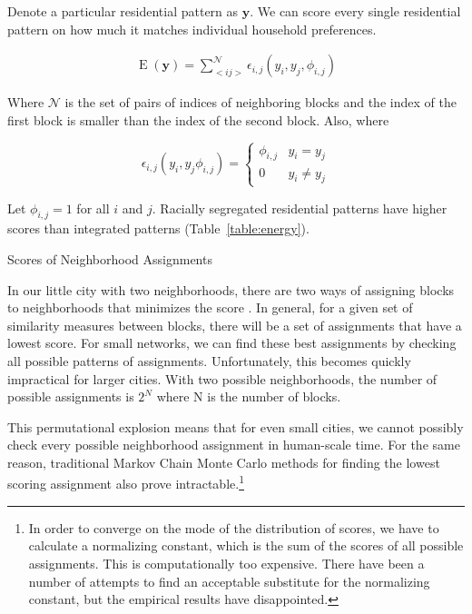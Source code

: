 Denote a particular residential pattern as $\mathbf{y}$.  We can score
every single residential pattern on how much it matches individual
household preferences.

\begin{align}
\operatorname{E}(\mathbf{y}) = \sum_{<i j>}^{\mathcal{N}}\epsilon_{i,j}(y_i,y_j,\phi_{i,j})
\end{align}

Where $\mathcal{N}$ is the set of pairs of indices of neighboring
blocks and the index of the first block is smaller than the index of
the second block. Also, where


\begin{equation}
\epsilon_{i,j}(y_i,y_j\phi_{i,j}) = \begin{cases}
  \phi_{i,j}   &y_i = y_j \\
  0  &y_i \neq y_j
\end{cases}
\end{equation}

Let $\phi_{i,j}=1$ for all $i$ and $j$. Racially segregated
residential patterns have higher scores than integrated patterns (Table~\ref{table:energy}).

\begin{table}[h]

\caption{Scores of Neighborhood Assignments}
\label{table:energy}
\end{table}

In our little city with two neighborhoods, there are two ways of
assigning blocks to neighborhoods that minimizes the score . In general, for a given set of similarity
measures between blocks, there will be a set of assignments that have
a lowest score. For small networks, we can find these best assignments
by checking all possible patterns of assignments. Unfortunately, this
becomes quickly impractical for larger cities. With two possible
neighborhoods, the number of possible assignments is $2^N$ where N is
the number of blocks.

This permutational explosion means that for even small cities, we
cannot possibly check every possible neighborhood assignment in
human-scale time. For the same reason, traditional Markov Chain Monte
Carlo methods for finding the lowest scoring assignment also prove
intractable.\footnote{In order to converge on the mode of the
  distribution of scores, we have to calculate a normalizing constant,
  which is the sum of the scores of all possible assignments. This is
  computationally too expensive. There have been a number of attempts
  to find an acceptable substitute for the normalizing constant, but
  the empirical results have disappointed.\cite{li_mrf_2009}}

